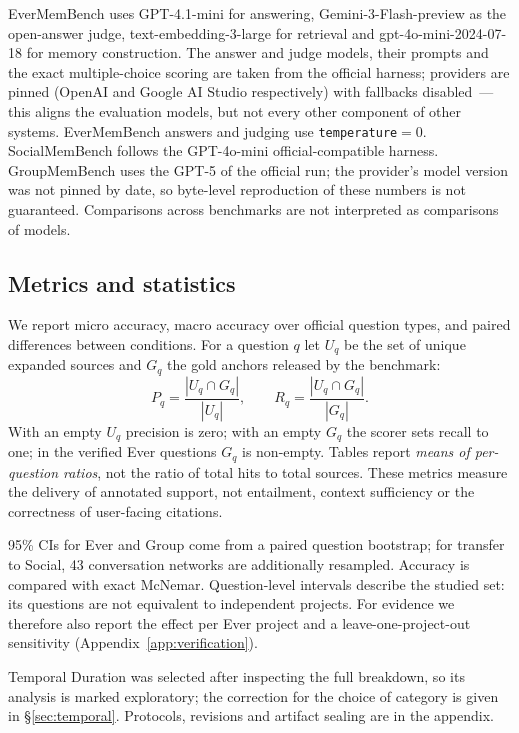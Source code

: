 \documentclass[11pt,a4paper]{article}
\begin{document}
EverMemBench uses GPT-4.1-mini for answering, Gemini-3-Flash-preview as the
open-answer judge, text-embedding-3-large for retrieval and gpt-4o-mini-2024-07-18
for memory construction. The answer and judge models, their prompts and the exact
multiple-choice scoring are taken from the official harness; providers are pinned
(OpenAI and Google AI Studio respectively) with fallbacks disabled~--- this aligns
the evaluation models, but not every other component of other systems. EverMemBench
answers and judging use \texttt{temperature}${}=0$. SocialMemBench follows the
GPT-4o-mini official-compatible harness. GroupMemBench uses the GPT-5 of the
official run; the provider's model version was not pinned by date, so byte-level
reproduction of these numbers is not guaranteed. Comparisons across benchmarks are
not interpreted as comparisons of models.

\subsection{Metrics and statistics}
\label{sec:stats}

We report micro accuracy, macro accuracy over official question types, and paired
differences between conditions. For a question $q$ let $U_q$ be the set of unique
expanded sources and $G_q$ the gold anchors released by the benchmark:
\[
P_q=\frac{|U_q\cap G_q|}{|U_q|},\qquad
R_q=\frac{|U_q\cap G_q|}{|G_q|}.
\]
With an empty $U_q$ precision is zero; with an empty $G_q$ the scorer sets recall to
one; in the verified Ever questions $G_q$ is non-empty. Tables report \emph{means of
per-question ratios}, not the ratio of total hits to total sources. These metrics
measure the delivery of annotated support, not entailment, context sufficiency or
the correctness of user-facing citations.

95\% CIs for Ever and Group come from a paired question bootstrap; for transfer to
Social, 43 conversation networks are additionally resampled. Accuracy is compared
with exact McNemar. Question-level intervals describe the studied set: its
questions are not equivalent to independent projects. For evidence we therefore
also report the effect per Ever project and a leave-one-project-out sensitivity
(Appendix~\ref{app:verification}).

Temporal Duration was selected after inspecting the full breakdown, so its analysis
is marked exploratory; the correction for the choice of category is given in
§\ref{sec:temporal}. Protocols, revisions and artifact sealing are in the appendix.
\end{document}
